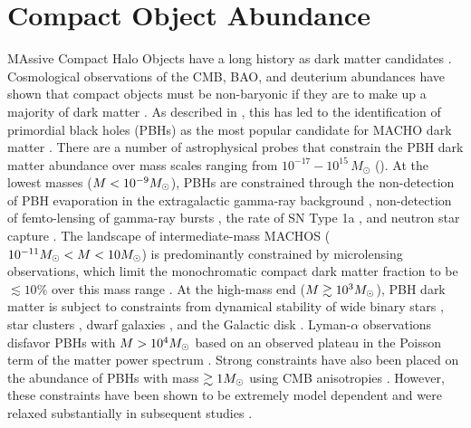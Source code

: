 \section{Compact Object Abundance }
\label{sec:compact_objects}

MAssive Compact Halo Objects \citep[MACHOs;][]{1991ApJ...366..412G} have a long history as dark matter candidates \citep{1974ApJ...193L...1O, 1980ApJS...44...73B, 1981ApJ...243..140G, 1986ApJ...304....1P, Bellido:1996, Clesse:2015, Bird:2016, Clesse:2016}. 
Cosmological observations of the CMB, BAO, and deuterium abundances have shown that compact objects must be non-baryonic if they are to make up a majority of dark matter \citep[\eg][]{Ade:2015xua}. 
As described in , this has led to the identification of primordial black holes (PBHs) as the most popular candidate for MACHO dark matter \citep{Bellido:1996}.
There are a number of astrophysical probes that constrain the PBH dark matter abundance over mass scales ranging from $10^{-17}-10^{15}\,M_\odot$ ().
At the lowest masses ($M < 10^{-9}M_\odot$), PBHs are constrained through the non-detection of PBH evaporation in the extragalactic gamma-ray background \citep[\eg,][]{0912.5297, 1604.05349}, non-detection of femto-lensing of gamma-ray bursts \citep[\eg,][]{1204.2056}, the rate of SN Type 1a \citep{1805.07381}, and neutron star capture \citep[\eg,][]{1301.4984}.
The landscape of intermediate-mass MACHOS ($10^{-11} M_\odot < M < 10 M_\odot$) is predominantly constrained by microlensing observations, which limit the monochromatic compact dark matter fraction to be $\lesssim 10\%$ over this mass range \citep[\eg][]{2001ApJ...550L.169A, 2007A&A...469..387T, 2009MNRAS.397.1228W, 1509.04899, 1701.02151, Calcino:2018}.
At the high-mass end ($M \gtrsim 10^3M_\odot$), PBH dark matter is subject to constraints from dynamical stability of wide binary stars \citep[\eg][]{2009MNRAS.396L..11Q, 2004ApJ...601..311Y}, star clusters \citep[\eg][]{2016ApJ...824L..31B, 1611.05052}, dwarf galaxies \citep{1704.01668}, and the Galactic disk \citep[\eg][]{1985ApJ...299..633L, 1994ApJ...437..184X}.
Lyman-$\alpha$ observations disfavor PBHs with $M > 10^4M_\odot$ based on an observed plateau in the Poisson term of the matter power spectrum \citep{astro-ph/0302035}.
Strong constraints have also been placed on the abundance of PBHs with mass $\gtrsim 1 M_\odot$ using CMB anisotropies \citep{2008ApJ...680..829R}.
However, these constraints have been shown to be extremely model dependent and were relaxed substantially in subsequent studies \citep{2017PhRvD..95d3534A}.

